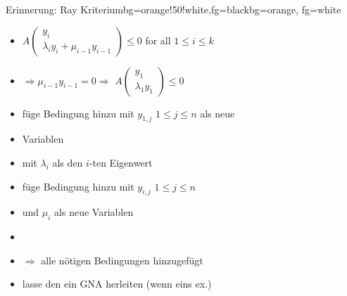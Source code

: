 \begin{frame}
	\begin{variableblock}{Erinnerung: Ray Kriterium}{bg=orange!50!white,fg=black}{bg=orange, fg=white}
		\begin{itemize}
			\setlength{\itemindent}{1cm}
			\item[(ray)] $A\begin{pmatrix} y_i \\ \lambda_i y_i + \mu_{i-1} y_{i-1} \end{pmatrix} \le 0$ for all $1 \le i \le k$
		\end{itemize}
	\end{variableblock}
	\begin{itemize}
		\setlength{\itemindent}{1cm}
		\item[$i=1$:] $\Rightarrow \mu_{i-1}y_{i-1}=0 \Rightarrow $ $A\begin{pmatrix} y_1 \\ \lambda_1 y_1 \end{pmatrix} \le 0$
		\item[]	f\"uge Bedingung hinzu mit $y_{1,j}$ $1\le j \le n$ als neue 
		\item[] Variablen
		\item[$i>1$:] mit $\lambda_i$ als den $i$-ten Eigenwert
		\item[] f\"uge Bedingung hinzu mit $y_{i,j}$ $1 \le j \le n$ 
		\item[] und $\mu_i$ als neue Variablen
		\item[]
		\item[] $\Rightarrow$ alle n\"otigen Bedingungen  hinzugef\"ugt\checkmark
		\item[] lasse den \solver ein GNA herleiten (wenn eins ex.)
	\end{itemize}	
\end{frame}

